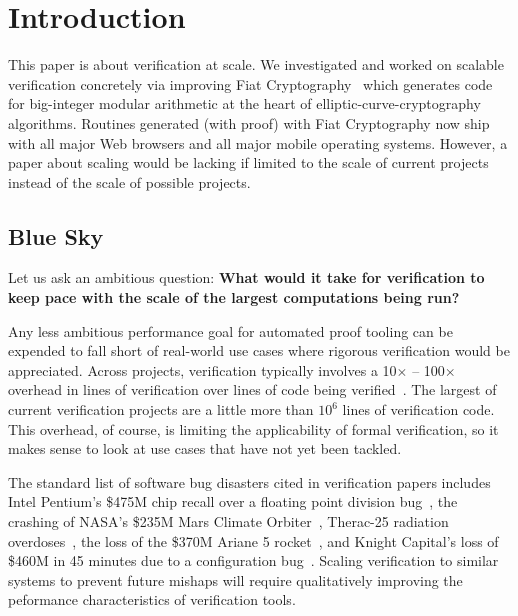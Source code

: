 \documentclass[sn-mathphys,pdflatex]{sn-jnl}%
\theoremstyle{thmstyleone}%
\theoremstyle{thmstyletwo}%
\theoremstyle{thmstylethree}%
\begin{document}
\section{Introduction}\label{sec:intro}

This paper is about verification at scale.
We investigated and worked on scalable verification concretely via improving Fiat Cryptography~\cite{FiatCryptoSP19} which generates code for big-integer modular arithmetic at the heart of elliptic-curve-cryptography algorithms.
Routines generated (with proof) with Fiat Cryptography now ship with all major Web browsers and all major mobile operating systems.
However, a paper about scaling would be lacking if limited to the scale of current projects instead of the scale of possible projects.

\subsection{Blue Sky}\label{sec:sky}

Let us ask an ambitious question:
\textbf{What would it take for verification to keep pace with the scale of the largest computations being run?}

Any less ambitious performance goal for automated proof tooling can be expended to fall short of real-world use cases where rigorous verification would be appreciated.
Across projects, verification typically involves a 10$\times$ -- 100$\times$ overhead in lines of verification over lines of code being verified~\cite{Gross2021thesis}.
The largest of current verification projects are a little more than $10^6$ lines of verification code.
This overhead, of course, is limiting the applicability of formal verification, so it makes sense to look at use cases that have not yet been tackled.

The standard list of software bug disasters cited in verification papers includes
Intel Pentium's \$475M chip recall over a floating point division bug~\cite{Infamous2014Gawron,Truth1995Halfhill,Pentium2011Nicely},
the crashing of NASA's \$235M Mars Climate Orbiter~\cite{lynch2017worst_mars,Metric1999Lloyd,Space1996Leech},
Therac-25 radiation overdoses~\citep[p.434]{Gift2018Baase}\cite{lynch2017worst_therac,Investigation1993Leveson},
the loss of the \$370M Ariane 5 rocket~\cite{lynch2017worst_ariane,Design1997Jazequel,Ariane1997Dowson},
and Knight Capital's loss of \$460M in 45 minutes due to a configuration bug~\cite{lynch2017worst_460m}.
Scaling verification to similar systems to prevent future mishaps will require qualitatively improving the peformance characteristics of verification tools.
\end{document}
